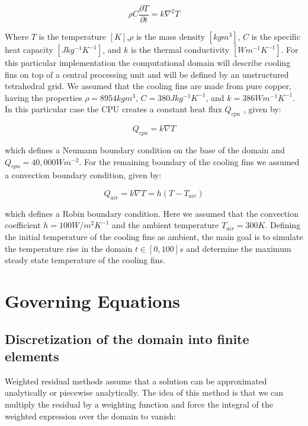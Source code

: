 \documentclass[12pt]{article}
\begin{document}
	\begin{equation}\label{eq:equation}
		\rho C \frac{\partial T}{\partial t} = k \nabla^2 T
	\end{equation}
	
Where $T$ is the temperature $[K]$,$\rho$ is the mass density $[kgm^3]$, $C$ is the specific heat capacity $[Jkg^{-1}K^{-1}]$, and $k$ is the thermal conductivity $[Wm^{-1}K^{-1}]$. For this particular implementation the computational domain will describe cooling fins on top of a central processing unit
and will be defined by an unstructured tetrahedral grid. We assumed that the cooling fins are made from pure copper, having the properties $\rho = 8954kgm^3$, $C = 380Jkg^{-1}K^{-1}$, and $k = 386Wm^{-1}K^{-1}$. \\

In this particular case the CPU creates a constant heat flux $Q_{cpu}$ , given by:

	\begin{equation}
		Q_{cpu} = k \nabla T
	\end{equation}
	
which defines a Neumann boundary condition on the base of the domain and $Q_{cpu} = 40,000Wm^{-2}$. For the remaining boundary of the cooling fins we assumed a convection boundary condition, given by:

	\begin{equation}
		Q_{air} = k \nabla T = h(T-T_{air})
	\end{equation}

which defines a Robin boundary condition. Here we assumed that the convection coefficient $h = 100W/m^2K^{-1}$ and the ambient temperature $T_{air} = 300K$. Defining the initial temperature of the cooling fins as ambient, the main goal is  to simulate the temperature rise in the domain $t \in [0,100]s$ and determine the maximum steady state temperature of the cooling fins.
	

	
	\section{Governing Equations}

\subsection{Discretization of the domain into finite elements}
Weighted residual methods assume that a solution can be approximated analytically or piecewise analytically. The idea of this method is that we can multiply the residual by a weighting function and force the integral of the weighted expression over the domain to vanish:
\end{document}
